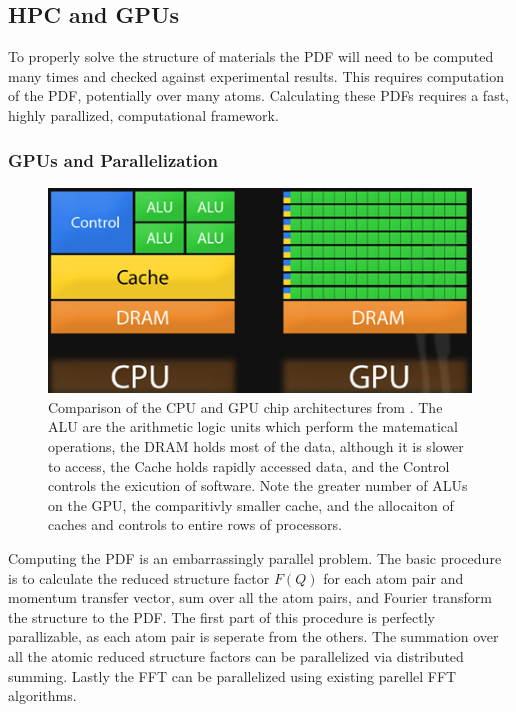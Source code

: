 \subsection{HPC and GPUs}
To properly solve the structure of materials the PDF will need to be computed many times and checked against experimental results.
This requires computation of the PDF, potentially over many atoms.
Calculating these PDFs requires a fast, highly parallized, computational framework.
\subsubsection{GPUs and Parallelization}
\begin{figure}
    \includegraphics[width=\textwidth]{cpu_gpu}
    \caption[Comparison of the CPU and GPU chip architectures]{
    Comparison of the CPU and GPU chip architectures from \cite{Chen2013}.
    The ALU are the arithmetic logic units which perform the matematical operations,
    the DRAM holds most of the data, although it is slower to access,
    the Cache holds rapidly accessed data,
    and the Control controls the exicution of software.
    Note the greater number of ALUs on the GPU, the comparitivly smaller cache,
    and the allocaiton of caches and controls to entire rows of processors.}
    \label{fig:cpu_vs_gpu}
\end{figure}
Computing the PDF is an embarrassingly parallel problem.
The basic procedure is to calculate the reduced structure factor $F(Q)$ for each atom pair and momentum transfer vector, sum over all the atom pairs, and Fourier transform the structure to the PDF.
The first part of this procedure is perfectly parallizable, as each atom pair is seperate from the others.
The summation over all the atomic reduced structure factors can be parallelized via distributed summing.
Lastly the FFT can be parallelized using existing parellel FFT algorithms.

